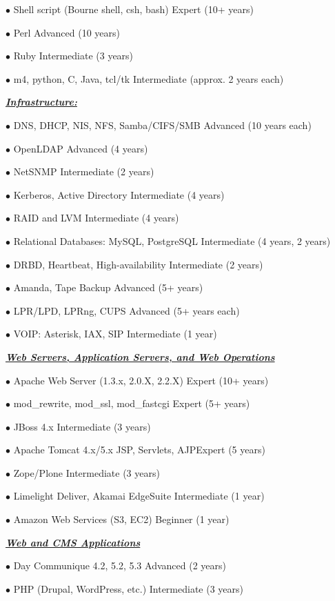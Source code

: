 \documentclass{article}
\newcommand{\skillset}[1]{{ \underline{\textbf{\emph{#1}}}\\  }}
\newcommand{\skill}[2]{{$\bullet$ #1 \hfill #2 }}
\begin{document}
\skill{Shell script (Bourne shell, csh, bash)}{Expert (10+ years)}

\skill{Perl}{Advanced (10 years)}

\skill{Ruby}{Intermediate (3 years)}

\skill{m4, python, C, Java, tcl/tk}{Intermediate (approx. 2 years each)}



\skillset{Infrastructure: }

\skill{DNS, DHCP, NIS, NFS, Samba/CIFS/SMB}{Advanced (10 years each)}

\skill{OpenLDAP}{Advanced (4 years)}

\skill{NetSNMP}{Intermediate (2 years)}

\skill{Kerberos, Active Directory}{Intermediate (4 years)}

\skill{RAID and LVM}{Intermediate (4 years)}

\skill{Relational Databases: MySQL, PostgreSQL}{Intermediate (4 years, 2 years)}

\skill{DRBD, Heartbeat, High-availability}{Intermediate (2 years)}

\skill{Amanda, Tape Backup}{Advanced (5+ years)}

\skill{LPR/LPD, LPRng, CUPS}{Advanced (5+ years each)}

\skill{VOIP: Asterisk, IAX, SIP}{Intermediate (1 year)}



\skillset{Web Servers, Application Servers, and Web Operations}

\skill{Apache Web Server (1.3.x, 2.0.X, 2.2.X)}{Expert (10+ years)}

\skill{mod\_rewrite, mod\_ssl, mod\_fastcgi}{Expert (5+ years)}

\skill{JBoss 4.x}{Intermediate (3 years)}

\skill{Apache Tomcat 4.x/5.x}

\skill{JSP, Servlets, AJP}{Expert (5 years)}

\skill{Zope/Plone}{Intermediate (3 years)}

\skill{Limelight Deliver, Akamai EdgeSuite}{Intermediate (1 year)}

\skill{Amazon Web Services (S3, EC2)}{Beginner (1 year)}



\skillset{Web and CMS Applications}

\skill{Day Communique 4.2, 5.2, 5.3}{Advanced (2 years)}

\skill{PHP (Drupal, WordPress, etc.)}{Intermediate (3 years)}
\end{document}
